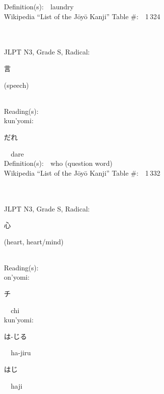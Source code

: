 \begin{multicols}{2}
Definition(s):\ \ laundry \\
Wikipedia ``List of the J\=oy\=o Kanji'' Table \#:\ \ 1\,324 \\
\ \ \\
{\fontsize{34pt}{40pt}  }\ \ \\  %
{JLPT N3, Grade S, Radical:\ \ {\begin{CJK}{UTF8}{min} 言 \end{CJK}} (speech) } \\
Reading(s):\ \ \\
{\hspace*{1em}}kun'yomi:\ \ \\
{\hspace*{2em}}{\begin{CJK}{UTF8}{min} だれ \end{CJK}}\ \ dare\ \ \\
Definition(s):\ \ who (question word) \\
Wikipedia ``List of the J\=oy\=o Kanji'' Table \#:\ \ 1\,332 \\
\ \ \\
{\fontsize{34pt}{40pt}  }\ \ \\  %
{JLPT N3, Grade S, Radical:\ \ {\begin{CJK}{UTF8}{min} 心 \end{CJK}} (heart, heart/mind) } \\
Reading(s):\ \ \\
{\hspace*{1em}}on'yomi:\ \ \\
{\hspace*{2em}}{\begin{CJK}{UTF8}{min} チ \end{CJK}}\ \ chi\ \ \\
{\hspace*{1em}}kun'yomi:\ \ \\
{\hspace*{2em}}{\begin{CJK}{UTF8}{min} は-じる \end{CJK}}\ \ ha-jiru\ \ \\
{\hspace*{2em}}{\begin{CJK}{UTF8}{min} はじ \end{CJK}}\ \ haji\ \ \\

\end{multicols}
